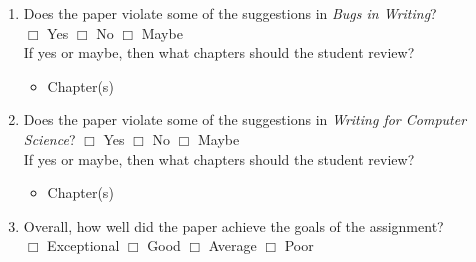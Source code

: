 \documentclass[letterpaper, 10pt]{article} %
\begin{document}
{\begin{enumerate}
\item Does the paper violate some of the suggestions in {\em Bugs in
  Writing}? \\ \hspace*{.05in} $\Box$ Yes \hspace*{.05in} $\Box$
  No \hspace*{.05in} $\Box$ Maybe \\ \hspace*{.05in} If yes or maybe,
  then what chapters should the student review? \vspace*{-.05in}

\begin{itemize}
\renewcommand{\labelitemi}{$\blacktriangleright$}

\setlength{\itemsep}{1pt}

\item Chapter(s) \underline{\hspace*{.75in}}

\end{itemize} \vspace*{-.05in}

\item Does the paper violate some of the suggestions in {\em Writing
  for Computer Science}? \hspace*{.05in} $\Box$ Yes \hspace*{.05in}
  $\Box$ No \hspace*{.05in} $\Box$ Maybe \\ \hspace*{.05in} If yes or
  maybe, then what chapters should the student
  review? \vspace*{-.05in}

\begin{itemize}
\renewcommand{\labelitemi}{$\blacktriangleright$}

\setlength{\itemsep}{1pt}

\item Chapter(s) \underline{\hspace*{.75in}}

\end{itemize}

\item Overall, how well did the paper achieve the goals of the assignment?
  \\ \hspace*{.05in} $\Box$ Exceptional \hspace*{.05in} $\Box$
  Good \hspace*{.05in} $\Box$ Average \hspace*{.05in} $\Box$ Poor

\end{enumerate}

}
\end{document}

